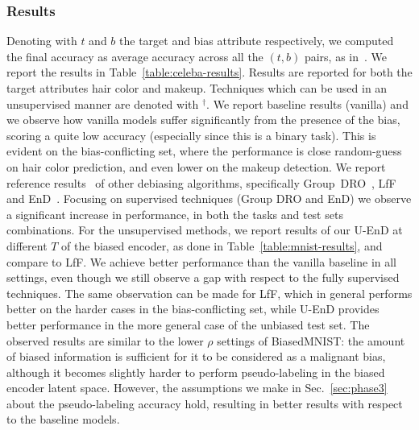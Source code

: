 \subsubsection{Results} 
Denoting with $t$ and $b$ the target and bias attribute respectively, we computed the final accuracy as average accuracy across all the $(t, b)$ pairs, as in~\cite{nam2020learning}. We report the results in Table~\ref{table:celeba-results}. Results are reported for both the target attributes hair color and makeup. Techniques which can be used in an unsupervised manner are denoted with $^\dagger$. We report baseline results (vanilla) and we observe how vanilla models suffer significantly from the presence of the bias, scoring a quite low accuracy (especially since this is a binary task). This is evident on the bias-conflicting set, where the performance is close random-guess on hair color prediction, and even lower on the makeup detection. We report reference results~\cite{nam2020learning} of other debiasing algorithms, specifically Group~DRO~\cite{sagawa2019distributionally}, LfF~\cite{nam2020learning} and EnD~\cite{tartaglione2021end}. Focusing on supervised techniques (Group DRO and EnD) we observe a significant increase in performance, in both the tasks and test sets combinations. For the unsupervised methods, we report results of our U-EnD at different $T$ of the biased encoder, as done in Table~\ref{table:mnist-results}, and compare to LfF. We achieve better performance than the vanilla baseline in all settings, even though we still observe a gap with respect to the fully supervised techniques. The same observation can be made for LfF, which in general performs better on the harder cases in the bias-conflicting set, while U-EnD provides better performance in the more general case of the unbiased test set. 
The observed results are similar to the lower $\rho$ settings of BiasedMNIST: the amount of biased information is sufficient for it to be considered as a malignant bias, although it becomes slightly harder to perform pseudo-labeling in the biased encoder latent space. However, the assumptions we make in Sec.~\ref{sec:phase3} about the pseudo-labeling accuracy hold, resulting in better results with respect to the baseline models. 


